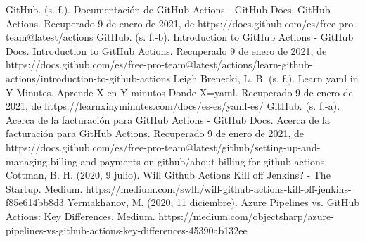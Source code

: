 \documentclass[twoside,twocolumn]{article}
\begin{document}

\begin{thebibliography}{99} 

\bibitem[1]{}
\newblock GitHub. (s. f.). Documentación de GitHub Actions - GitHub Docs. GitHub Actions. Recuperado 9 de enero de 2021, de https://docs.github.com/es/free-pro-team@latest/actions
\bibitem[2]{}
\newblock GitHub. (s. f.-b). Introduction to GitHub Actions - GitHub Docs. Introduction to GitHub Actions. Recuperado 9 de enero de 2021, de https://docs.github.com/es/free-pro-team@latest/actions/learn-github-actions/introduction-to-github-actions
\bibitem[3]{}
\newblock Leigh Brenecki, L. B. (s. f.). Learn yaml in Y Minutes. Aprende X en Y minutos Donde X=yaml. Recuperado 9 de enero de 2021, de https://learnxinyminutes.com/docs/es-es/yaml-es/
\bibitem[4]{}
\newblock GitHub. (s. f.-a). Acerca de la facturación para GitHub Actions - GitHub Docs. Acerca de la facturación para GitHub Actions. Recuperado 9 de enero de 2021, de https://docs.github.com/es/free-pro-team@latest/github/setting-up-and-managing-billing-and-payments-on-github/about-billing-for-github-actions
\bibitem[5]{}
\newblock Cottman, B. H. (2020, 9 julio). Will Github Actions Kill off Jenkins? - The Startup. Medium. https://medium.com/swlh/will-github-actions-kill-off-jenkins-f85e614bb8d3
\bibitem[6]{}
\newblock Yermakhanov, M. (2020, 11 diciembre). Azure Pipelines vs. GitHub Actions: Key Differences. Medium. https://medium.com/objectsharp/azure-pipelines-vs-github-actions-key-differences-45390ab132ee

\end{thebibliography}


\end{document}
